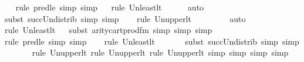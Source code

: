 \begin{isabellebody}
\ \ \isamarkupfalse%
{\isacharparenleft}{\kern0pt}rule\ pred{\isacharunderscore}{\kern0pt}le{\isacharcomma}{\kern0pt}\ simp{\isacharcomma}{\kern0pt}\ simp{\isacharparenright}{\kern0pt}\isanewline
\ \ \isamarkupfalse%
{\isacharparenleft}{\kern0pt}rule\ Un{\isacharunderscore}{\kern0pt}least{\isacharunderscore}{\kern0pt}lt{\isacharparenright}{\kern0pt}{\isacharplus}{\kern0pt}\isanewline
\ \ \ \ \isamarkupfalse%
\ auto{\isacharbrackleft}{\kern0pt}{}{\isacharbrackright}{\kern0pt}\isanewline
\ \ \ \isamarkupfalse%
{\isacharparenleft}{\kern0pt}subst\ succ{\isacharunderscore}{\kern0pt}Un{\isacharunderscore}{\kern0pt}distrib{\isacharcomma}{\kern0pt}\ simp{\isacharcomma}{\kern0pt}\ simp{\isacharparenright}{\kern0pt}{\isacharplus}{\kern0pt}\isanewline
\ \ \ \isamarkupfalse%
{\isacharparenleft}{\kern0pt}rule\ Un{\isacharunderscore}{\kern0pt}upper{}{\isacharunderscore}{\kern0pt}lt{\isacharparenright}{\kern0pt}{\isacharplus}{\kern0pt}\isanewline
\ \ \ \ \ \ \ \isamarkupfalse%
\ auto{\isacharbrackleft}{\kern0pt}{}{\isacharbrackright}{\kern0pt}\isanewline
\ \ \isamarkupfalse%
{\isacharparenleft}{\kern0pt}rule\ Un{\isacharunderscore}{\kern0pt}least{\isacharunderscore}{\kern0pt}lt{\isacharparenright}{\kern0pt}{\isacharplus}{\kern0pt}\isanewline
\ \ \isamarkupfalse%
{\isacharparenleft}{\kern0pt}subst\ arity{\isacharunderscore}{\kern0pt}cartprod{\isacharunderscore}{\kern0pt}fm{\isacharcomma}{\kern0pt}\ simp{\isacharcomma}{\kern0pt}\ simp{\isacharcomma}{\kern0pt}\ simp{\isacharparenright}{\kern0pt}\isanewline
\ \ \ \isamarkupfalse%
{\isacharparenleft}{\kern0pt}rule\ pred{\isacharunderscore}{\kern0pt}le{\isacharcomma}{\kern0pt}\ simp{\isacharcomma}{\kern0pt}\ simp{\isacharparenright}{\kern0pt}\isanewline
\ \ \ \isamarkupfalse%
{\isacharparenleft}{\kern0pt}rule\ Un{\isacharunderscore}{\kern0pt}least{\isacharunderscore}{\kern0pt}lt{\isacharparenright}{\kern0pt}{\isacharplus}{\kern0pt}\isanewline
\ \ \ \ \ \ \isamarkupfalse%
{\isacharparenleft}{\kern0pt}subst\ succ{\isacharunderscore}{\kern0pt}Un{\isacharunderscore}{\kern0pt}distrib{\isacharcomma}{\kern0pt}\ simp{\isacharcomma}{\kern0pt}\ simp{\isacharparenright}{\kern0pt}{\isacharplus}{\kern0pt}\isanewline
\ \ \ \ \ \ \isamarkupfalse%
{\isacharparenleft}{\kern0pt}rule\ Un{\isacharunderscore}{\kern0pt}upper{}{\isacharunderscore}{\kern0pt}lt{\isacharcomma}{\kern0pt}\ rule\ Un{\isacharunderscore}{\kern0pt}upper{}{\isacharunderscore}{\kern0pt}lt{\isacharcomma}{\kern0pt}\ rule\ Un{\isacharunderscore}{\kern0pt}upper{}{\isacharunderscore}{\kern0pt}lt{\isacharcomma}{\kern0pt}\ simp{\isacharcomma}{\kern0pt}\ simp{\isacharcomma}{\kern0pt}\ simp{\isacharcomma}{\kern0pt}\ simp{\isacharparenright}{\kern0pt}\isanewline

\end{isabellebody}
